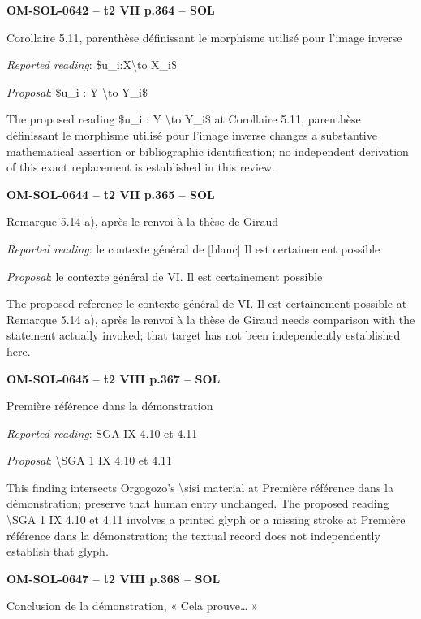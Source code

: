 \par\noindent\textbf{OM-SOL-0642 -- t2 VII p.364 -- SOL}\par
Corollaire 5.11, parenthèse définissant le morphisme utilisé pour l'image inverse\par
\emph{Reported reading}: \$u\_i:X\textbackslash{}to X\_i\$\par
\emph{Proposal}: \$u\_i : Y \textbackslash{}to Y\_i\$\par
The proposed reading \$u\_i : Y \textbackslash{}to Y\_i\$ at Corollaire 5.11, parenthèse définissant le morphisme utilisé pour l'image inverse changes a substantive mathematical assertion or bibliographic identification; no independent derivation of this exact replacement is established in this review.\par
\par\noindent\textbf{OM-SOL-0644 -- t2 VII p.365 -- SOL}\par
Remarque 5.14 a), après le renvoi à la thèse de Giraud\par
\emph{Reported reading}: le contexte général de [blanc] Il est certainement possible\par
\emph{Proposal}: le contexte général de VI. Il est certainement possible\par
The proposed reference le contexte général de VI. Il est certainement possible at Remarque 5.14 a), après le renvoi à la thèse de Giraud needs comparison with the statement actually invoked; that target has not been independently established here.\par
\par\noindent\textbf{OM-SOL-0645 -- t2 VIII p.367 -- SOL}\par
Première référence dans la démonstration\par
\emph{Reported reading}: SGA IX 4.10 et 4.11\par
\emph{Proposal}: \textbackslash{}SGA 1 IX 4.10 et 4.11\par
This finding intersects Orgogozo's \textbackslash{}sisi material at Première référence dans la démonstration; preserve that human entry unchanged. The proposed reading \textbackslash{}SGA 1 IX 4.10 et 4.11 involves a printed glyph or a missing stroke at Première référence dans la démonstration; the textual record does not independently establish that glyph.\par
\par\noindent\textbf{OM-SOL-0647 -- t2 VIII p.368 -- SOL}\par
Conclusion de la démonstration, « Cela prouve… »\par

